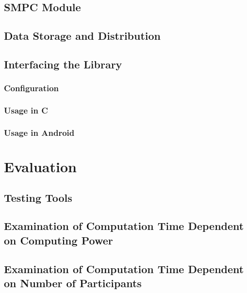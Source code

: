 	\section{\gls{SMPC} Module}
	
	\section{Data Storage and Distribution}
	
	\section{Interfacing the Library}
	
		\subsection*{Configuration}
		
		\subsection*{Usage in C}
		
		\subsection*{Usage in Android}
		
\chapter{Evaluation }

	\section{Testing Tools}
	

	\section{Examination of Computation Time Dependent on Computing Power}
	
	\section{Examination of Computation Time Dependent on Number of Participants}
	
		
